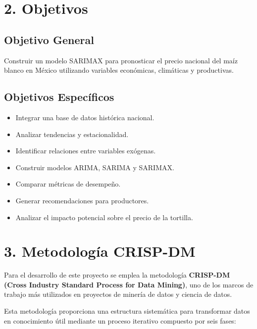 \documentclass[11pt]{article}
\providecommand{\tightlist}{%
      \setlength{\itemsep}{0pt}\setlength{\parskip}{0pt}}
\begin{document}
    \hypertarget{objetivos}{%
\section{2. Objetivos}\label{objetivos}}

\hypertarget{objetivo-general}{%
\subsection{Objetivo General}\label{objetivo-general}}

Construir un modelo SARIMAX para pronosticar el precio nacional del maíz
blanco en México utilizando variables económicas, climáticas y
productivas.

\hypertarget{objetivos-especuxedficos}{%
\subsection{Objetivos Específicos}\label{objetivos-especuxedficos}}

\begin{itemize}
\tightlist
\item
  Integrar una base de datos histórica nacional.
\item
  Analizar tendencias y estacionalidad.
\item
  Identificar relaciones entre variables exógenas.
\item
  Construir modelos ARIMA, SARIMA y SARIMAX.
\item
  Comparar métricas de desempeño.
\item
  Generar recomendaciones para productores.
\item
  Analizar el impacto potencial sobre el precio de la tortilla.
\end{itemize}

    \hypertarget{metodologuxeda-crisp-dm}{%
\section{3. Metodología CRISP-DM}\label{metodologuxeda-crisp-dm}}

Para el desarrollo de este proyecto se emplea la metodología
\textbf{CRISP-DM (Cross Industry Standard Process for Data Mining)}, uno
de los marcos de trabajo más utilizados en proyectos de minería de datos
y ciencia de datos.

Esta metodología proporciona una estructura sistemática para transformar
datos en conocimiento útil mediante un proceso iterativo compuesto por
seis fases:
\end{document}
